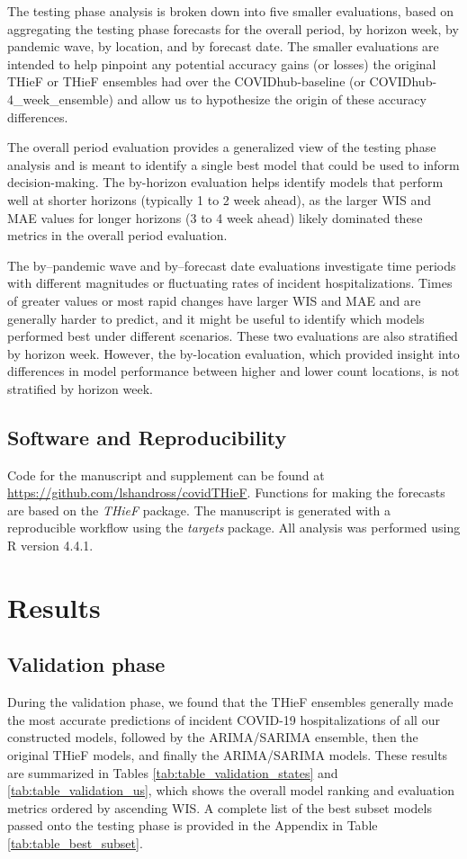 \documentclass[12pt]{article}
\begin{document}
The testing phase analysis is broken down into five smaller evaluations, based on aggregating the testing phase forecasts for the overall period, by horizon week, by pandemic wave, by location, and by forecast date. The smaller evaluations are intended to help pinpoint any potential accuracy gains (or losses) the original THieF or THieF ensembles had over the COVIDhub-baseline (or COVIDhub-4\_week\_ensemble) and allow us to hypothesize the origin of these accuracy differences.

The overall period evaluation provides a generalized view of the testing phase analysis and is meant to identify a single best model that could be used to inform decision-making. The by-horizon evaluation helps identify models that perform well at shorter horizons (typically 1 to 2 week ahead), as the larger WIS and MAE values for longer horizons (3 to 4 week ahead) likely dominated these metrics in the overall period evaluation\cite{short_horizons}.

The by--pandemic wave and by--forecast date evaluations investigate time periods with different magnitudes or fluctuating rates of incident hospitalizations. Times of greater values or most rapid changes have larger WIS and MAE and are generally harder to predict\cite{mech_bayes, short_horizons}, and it might be useful to identify which models performed best under different scenarios. These two evaluations are also stratified by horizon week. However, the by-location evaluation, which provided insight into differences in model performance between higher and lower count locations, is not stratified by horizon week.

\subsection{Software and Reproducibility} \label{reproducibility}
Code for the manuscript and supplement can be found at \url{https://github.com/lshandross/covidTHieF}. Functions for making the forecasts are based on the \textit{THieF} package. The manuscript is generated with a reproducible workflow using the \textit{targets} package. All analysis was performed using R version 4.4.1\cite{RSoftware}.

\section{Results} \label{results}
\subsection{Validation phase} \label{validation_results}
During the validation phase, we found that the THieF ensembles generally made the most accurate predictions of incident COVID-19 hospitalizations of all our constructed models, followed by the ARIMA/SARIMA ensemble, then the original THieF models, and finally the ARIMA/SARIMA models. These results are summarized in Tables \ref{tab:table_validation_states} and \ref{tab:table_validation_us}, which shows the overall model ranking and evaluation metrics ordered by ascending WIS. A complete list of the best subset models passed onto the testing phase is provided in the Appendix in Table \ref{tab:table_best_subset}.
\end{document}
